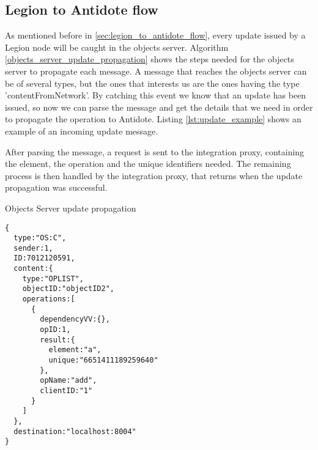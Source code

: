 \subsection{Legion to Antidote flow}
\label{sec:legion_changes_legion_to_antidote_flow}
As mentioned before in \ref{sec:legion_to_antidote_flow}, every update issued by a Legion node will be caught in the objects server. Algorithm \ref{objects_server_update_propagation} shows the steps needed for the objects server to propagate each message. A message that reaches the objects server can be of several types, but the ones that interests us are the ones having the type 'contentFromNetwork'. By catching this event we know that an update has been issued, so now we can parse the message and get the details that we need in order to propagate the operation to Antidote. Listing \ref{lst:update_example} shows an example of an incoming update message.\par
	After parsing the message, a request is sent to the integration proxy, containing the element, the operation and the unique identifiers needed. The remaining process is then handled by the integration proxy, that returns when the update propagation was successful.
	
\begin{algorithm}
\caption{Objects Server update propagation}\label{objects_server_update_propagation}
\begin{algorithmic}[1]
      \End
  \EndIf
\End
\end{algorithmic}
\end{algorithm}
	

\begin{lstlisting}[caption={Legion update content message example},label={lst:update_example}]
{
  type:"OS:C",
  sender:1,
  ID:7012120591,
  content:{
    type:"OPLIST",
    objectID:"objectID2",
    operations:[
      {
        dependencyVV:{},
        opID:1,
        result:{
          element:"a",
          unique:"6651411189259640"
        },
        opName:"add",
        clientID:"1"
      }
    ]
  },
  destination:"localhost:8004"
}
\end{lstlisting}

